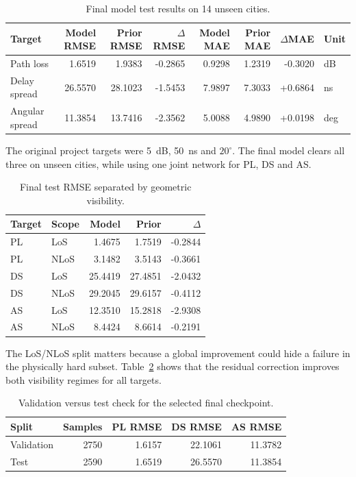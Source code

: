 \begin{table}[htbp]
\centering
\caption{Final model test results on 14 unseen cities.}
\label{tab:try80_final_test_overall}
\scriptsize
\setlength{\tabcolsep}{3pt}
\begin{tabular}{lrrrrrrl}
\toprule
Target & Model RMSE & Prior RMSE & \(\Delta\)RMSE & Model MAE & Prior MAE & \(\Delta\)MAE & Unit \\
\midrule
Path loss & 1.6519 & 1.9383 & -0.2865 & 0.9298 & 1.2319 & -0.3020 & dB \\
Delay spread & 26.5570 & 28.1023 & -1.5453 & 7.9897 & 7.3033 & +0.6864 & ns \\
Angular spread & 11.3854 & 13.7416 & -2.3562 & 5.0088 & 4.9890 & +0.0198 & deg \\
\bottomrule
\end{tabular}
\end{table}

The original project targets were \SI{5}{dB}, \SI{50}{ns} and
\(20^\circ\). The final model clears all three on unseen cities, while using
one joint network for PL, DS and AS.

\begin{table}[htbp]
\centering
\caption{Final test RMSE separated by geometric visibility.}
\label{tab:try80_final_test_los_nlos}
\scriptsize
\begin{tabular}{llrrr}
\toprule
Target & Scope & Model & Prior & \(\Delta\) \\
\midrule
PL & LoS & 1.4675 & 1.7519 & -0.2844 \\
PL & NLoS & 3.1482 & 3.5143 & -0.3661 \\
DS & LoS & 25.4419 & 27.4851 & -2.0432 \\
DS & NLoS & 29.2045 & 29.6157 & -0.4112 \\
AS & LoS & 12.3510 & 15.2818 & -2.9308 \\
AS & NLoS & 8.4424 & 8.6614 & -0.2191 \\
\bottomrule
\end{tabular}
\end{table}

The LoS/NLoS split matters because a global improvement could hide a failure in
the physically hard subset. Table~\ref{tab:try80_final_test_los_nlos} shows
that the residual correction improves both visibility regimes for all targets.

\begin{table}[htbp]
\centering
\caption{Validation versus test check for the selected final checkpoint.}
\label{tab:try80_val_test_sanity}
\scriptsize
\begin{tabular}{lrrrr}
\toprule
Split & Samples & PL RMSE & DS RMSE & AS RMSE \\
\midrule
Validation & 2750 & 1.6157 & 22.1061 & 11.3782 \\
Test & 2590 & 1.6519 & 26.5570 & 11.3854 \\
\bottomrule
\end{tabular}
\end{table}

